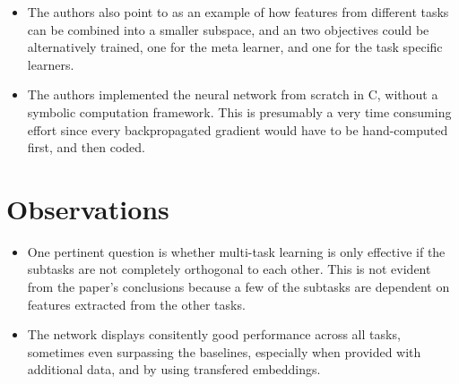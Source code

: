 \documentclass[12pt]{scrartcl}
\begin{document}
\begin{itemize}
    \item The authors also point to \cite{ando2005framework} as an example of how features from different tasks can be combined into a smaller subspace, and an two objectives could be alternatively trained, one for the meta learner, and one for the task specific learners.
    \item The authors implemented the neural network from scratch in C, without a symbolic computation framework. This is presumably a very time consuming effort since every backpropagated gradient would have to be hand-computed first, and then coded.
  \end{itemize}

\section{Observations}
  \begin{itemize}
    \item One pertinent question is whether multi-task learning is only effective if the subtasks are not completely orthogonal to each other. This is not evident from the paper's conclusions because a few of the subtasks are dependent on features extracted from the other tasks.
    \item The network displays consitently good performance across all tasks, sometimes even surpassing the baselines, especially when provided with additional data, and by using transfered embeddings.
  \end{itemize}



\end{document}
